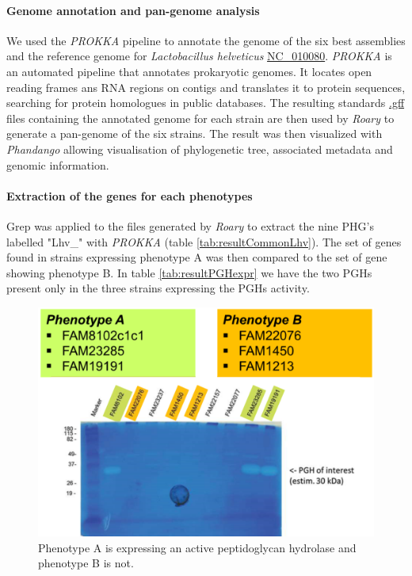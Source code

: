 \documentclass[10pt,a4paper]{article}
\begin{document}
\paragraph{Genome annotation and pan-genome analysis}
We used the \textit{PROKKA} pipeline\cite{seemann_prokka:_2014} to annotate the genome of the six best assemblies and the reference genome for \textit{Lactobacillus helveticus} \href{https://www.ncbi.nlm.nih.gov/genome/?term=NC_010080}{NC\_010080}. \textit{PROKKA} is an automated pipeline that annotates prokaryotic genomes. It locates open reading frames ans RNA regions on contigs and translates it to protein sequences, searching for protein homologues in public databases. The resulting standards \href{https://www.ensembl.org/info/website/upload/gff.html}{.gff} files containing the annotated genome for each strain are then used by \textit{Roary}\cite{page_roary:_2015} to generate a pan-genome of the six strains. The result was then visualized with \textit{Phandango}\cite{hadfield_phandango:_2018} allowing visualisation of phylogenetic tree, associated metadata and genomic information.


\paragraph{Extraction of the genes for each phenotypes} Grep was applied to the files generated by \textit{Roary} to extract the nine PHG's \cite{jebava_nine_2011} labelled "Lhv\_" with \textit{PROKKA} (table \ref{tab:resultCommonLhv}). The set of genes found in strains expressing phenotype A was then compared to the set of gene showing phenotype B. In table \ref{tab:resultPGHexpr} we have the two PGHs present only in the three strains expressing the PGHs activity.  


\begin{figure}
	\centering
	\includegraphics[width=0.7\linewidth]{img/zymography}
	\caption[The two phenotypes expressed by the six strains]{Phenotype A is expressing an active peptidoglycan hydrolase and phenotype B is not.}
	\label{fig:zymography}
\end{figure}
\end{document}

